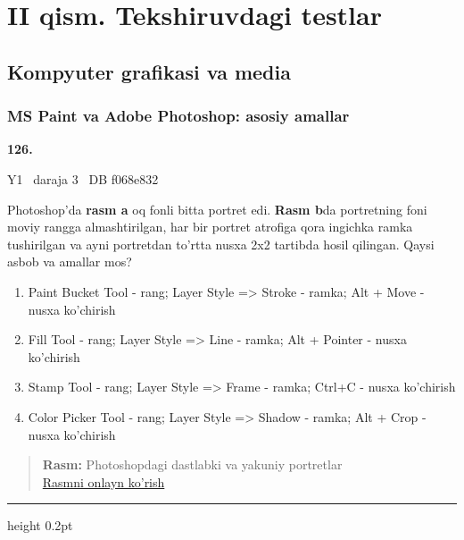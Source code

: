 \documentclass[10pt,a4paper,oneside]{article}
\begin{document}
\section{II qism. Tekshiruvdagi testlar}
\subsection{Kompyuter grafikasi va media}
\subsubsection{MS Paint va Adobe Photoshop: asosiy amallar}
\hypertarget{q126}{\textbf{\color{ink}126.}}  {\color{muted}\scriptsize Y1 \textbullet\ daraja 3 \textbullet\ DB f068e832}
\par
Photoshop'da \textbf{rasm a} oq fonli bitta portret edi. \textbf{Rasm b}da portretning foni moviy rangga almashtirilgan, har bir portret atrofiga qora ingichka ramka tushirilgan va ayni portretdan to'rtta nusxa 2x2 tartibda hosil qilingan. Qaysi asbob va amallar mos?
\begin{enumerate}[label=\Alph*),leftmargin=9mm]
\item Paint Bucket Tool - rang; Layer Style =\textgreater{} Stroke - ramka; Alt + Move - nusxa ko'chirish
\item Fill Tool - rang; Layer Style =\textgreater{} Line - ramka; Alt + Pointer - nusxa ko'chirish
\item Stamp Tool - rang; Layer Style =\textgreater{} Frame - ramka; Ctrl+C - nusxa ko'chirish
\item Color Picker Tool - rang; Layer Style =\textgreater{} Shadow - ramka; Alt + Crop - nusxa ko'chirish
\end{enumerate}
\begin{quote}\footnotesize\color{muted}\textbf{Rasm:} Photoshopdagi dastlabki va yakuniy portretlar\\
\href{https://github.com/sarvar9417/attestatsiya/blob/main/public/kuzgi-demo/demo_q17_photoshop.svg}{Rasmni onlayn ko'rish}
\end{quote}
\vspace{2mm}\hrule height 0.2pt \vspace{4mm}
\end{document}
